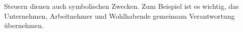 Steuern dienen auch symbolischen Zwecken.
Zum Beispiel ist es wichtig, das Unternehmen, Arbeitnehmer und Wohlhabende gemeinsam Verantwortung übernehmen.
